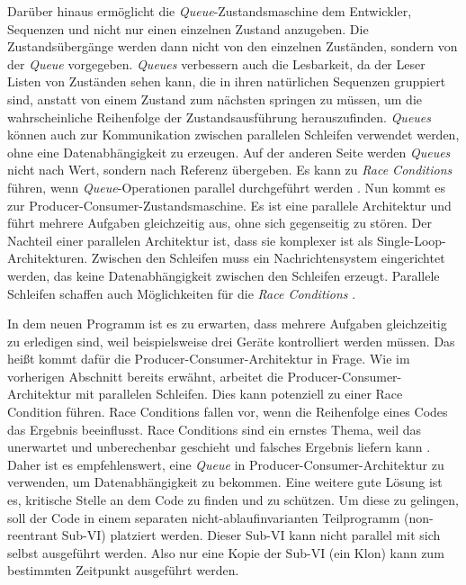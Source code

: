 Darüber hinaus ermöglicht die \textit{Queue}-Zustandsmaschine dem Entwickler, Sequenzen und nicht nur einen einzelnen Zustand anzugeben. Die Zustandsübergänge werden dann nicht von den einzelnen Zuständen, sondern von der \textit{Queue} vorgegeben. \textit{Queues} verbessern auch die Lesbarkeit, da der Leser Listen von Zuständen sehen kann, die in ihren natürlichen Sequenzen gruppiert sind, anstatt von einem Zustand zum nächsten springen zu müssen, um die wahrscheinliche Reihenfolge der Zustandsausführung herauszufinden. \textit{Queues} können auch zur Kommunikation zwischen parallelen Schleifen verwendet werden, ohne eine Datenabhängigkeit zu erzeugen. Auf der anderen Seite werden \textit{Queues} nicht nach Wert, sondern nach Referenz übergeben. Es kann zu \textit{Race Conditions} führen, wenn \textit{Queue}-Operationen parallel durchgeführt werden \citep[Kapitel 31.3]{Bress_Effective_Labview_programming_2013}. Nun kommt es zur Producer-Consumer-Zustandsmaschine. Es ist eine parallele Architektur und führt mehrere Aufgaben gleichzeitig aus, ohne sich gegenseitig zu stören. Der Nachteil einer parallelen Architektur ist, dass sie komplexer ist als Single-Loop-Architekturen. Zwischen den Schleifen muss ein Nachrichtensystem eingerichtet werden, das keine Datenabhängigkeit zwischen den Schleifen erzeugt. Parallele Schleifen schaffen auch Möglichkeiten für die \textit{Race Conditions} \citep[Kapitel 31.6]{Bress_Effective_Labview_programming_2013}.

In dem neuen Programm ist es zu erwarten, dass mehrere Aufgaben gleichzeitig zu erledigen sind, weil beispielsweise drei Geräte kontrolliert werden müssen. Das heißt kommt dafür die Producer-Consumer-Architektur in Frage. Wie im vorherigen Abschnitt bereits erwähnt, arbeitet die Producer-Consumer-Architektur mit parallelen Schleifen. Dies kann potenziell zu einer Race Condition führen. Race Conditions fallen vor, wenn die Reihenfolge eines Codes das Ergebnis beeinflusst. Race Conditions sind ein ernstes Thema, weil das unerwartet und unberechenbar geschieht und falsches Ergebnis liefern kann \citep[Kapitel 28]{Bress_Effective_Labview_programming_2013}. Daher ist es empfehlenswert, eine \textit{Queue} in Producer-Consumer-Architektur zu verwenden, um Datenabhängigkeit zu bekommen. Eine weitere gute Lösung ist es, kritische Stelle an dem Code zu finden und zu schützen. Um diese zu gelingen, soll der Code in einem separaten nicht-ablaufinvarianten Teilprogramm (non-reentrant Sub-VI) platziert werden. Dieser Sub-VI kann nicht parallel mit sich selbst ausgeführt werden. Also nur eine Kopie der Sub-VI (ein Klon) kann zum bestimmten Zeitpunkt ausgeführt werden.


